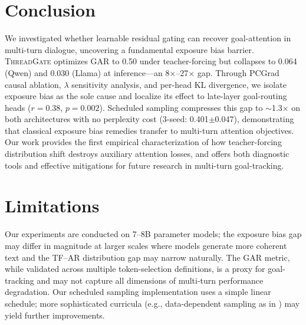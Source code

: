 \documentclass[11pt]{article}
\newcommand{\gar}{\textsc{GAR}}
\newcommand{\tg}{\textsc{ThreadGate}}
\begin{document}
\section{Conclusion}

We investigated whether learnable residual gating can recover goal-attention in multi-turn dialogue, uncovering a fundamental exposure bias barrier. \tg{} optimizes \gar{} to 0.50 under teacher-forcing but collapses to 0.064 (Qwen) and 0.030 (Llama) at inference---an 8$\times$--27$\times$ gap. Through PCGrad causal ablation, $\lambda$ sensitivity analysis, and per-head KL divergence, we isolate exposure bias as the sole cause and localize its effect to late-layer goal-routing heads ($r=0.38$, $p=0.002$). Scheduled sampling compresses this gap to ${\sim}$1.3$\times$ on both architectures with no perplexity cost (3-seed: 0.401$\pm$0.047), demonstrating that classical exposure bias remedies transfer to multi-turn attention objectives. Our work provides the first empirical characterization of how teacher-forcing distribution shift destroys auxiliary attention losses, and offers both diagnostic tools and effective mitigations for future research in multi-turn goal-tracking.

\section*{Limitations}

Our experiments are conducted on 7--8B parameter models; the exposure bias gap may differ in magnitude at larger scales where models generate more coherent text and the TF--AR distribution gap may narrow naturally. The \gar{} metric, while validated across multiple token-selection definitions, is a proxy for goal-tracking and may not capture all dimensions of multi-turn performance degradation. Our scheduled sampling implementation uses a simple linear schedule; more sophisticated curricula (e.g., data-dependent sampling as in \citet{dou2022parallel}) may yield further improvements.


\end{document}
